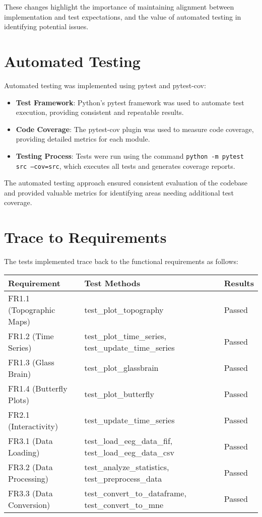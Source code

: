 \documentclass[12pt, titlepage]{article}
\begin{document}
These changes highlight the importance of maintaining alignment between implementation and test expectations, and the value of automated testing in identifying potential issues.

\section{Automated Testing}
		
Automated testing was implemented using pytest and pytest-cov:

\begin{itemize}
    \item \textbf{Test Framework}: Python's pytest framework was used to automate test execution, providing consistent and repeatable results.
    
    \item \textbf{Code Coverage}: The pytest-cov plugin was used to measure code coverage, providing detailed metrics for each module.
    
    \item \textbf{Testing Process}: Tests were run using the command \texttt{python -m pytest src --cov=src}, which executes all tests and generates coverage reports.
\end{itemize}

The automated testing approach ensured consistent evaluation of the codebase and provided valuable metrics for identifying areas needing additional test coverage.

\section{Trace to Requirements}
		
The tests implemented trace back to the functional requirements as follows:

\begin{tabularx}{\textwidth}{p{3cm}p{5cm}X}
\toprule {\bf Requirement} & {\bf Test Methods} & {\bf Results}\\
\midrule
FR1.1 (Topographic Maps) & test\_plot\_topography & Passed\\
FR1.2 (Time Series) & test\_plot\_time\_series, test\_update\_time\_series & Passed\\
FR1.3 (Glass Brain) & test\_plot\_glassbrain & Passed\\
FR1.4 (Butterfly Plots) & test\_plot\_butterfly & Passed\\
FR2.1 (Interactivity) & test\_update\_time\_series & Passed\\
FR3.1 (Data Loading) & test\_load\_eeg\_data\_fif, test\_load\_eeg\_data\_csv & Passed\\
FR3.2 (Data Processing) & test\_analyze\_statistics, test\_preprocess\_data & Passed\\
FR3.3 (Data Conversion) & test\_convert\_to\_dataframe, test\_convert\_to\_mne & Passed\\
\bottomrule
\end{tabularx}
\end{document}
